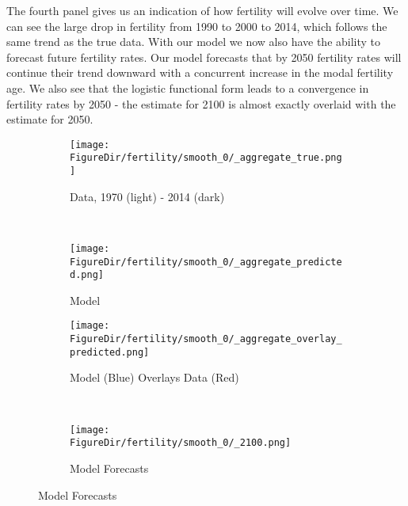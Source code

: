 \documentclass[10pt]{article}
\renewcommand{\thesection}{\arabic{section}}
\renewcommand{\thesubsection}{\thesection.\arabic{subsection}}
\renewcommand{\thesubsubsection}{\thesubsection.\arabic{subsubsection}}
\renewcommand{\subsubsection}[2][]{\oldsubsubsection[#1]{#2}\index{#1}\label{sec:\thesubsubsection}}
\numberwithin{equation}{subsection}
\newcommand*{\FigureDir}{../../graphs}
\begin{document}
\par The fourth panel gives us an indication of how fertility will evolve over time. We can see the large drop in fertility from 1990 to 2000 to 2014, which follows the same trend as the true data. With our model we now also have the ability to forecast future fertility rates. Our model forecasts that by 2050 fertility rates will continue their trend downward with a concurrent increase in the modal fertility age. We also see that the logistic functional form leads to a convergence in fertility rates by 2050 - the estimate for 2100 is almost exactly overlaid with the estimate for 2050.

\begin{figure}[!ht]
	\centering
   \caption{\label{fig:\thesubsubsection.3}Fertility Generalized Beta 2 Model Fit}
		\begin{subfigure}{0.5\textwidth}
			\centering
			\texttt{[image: \\FigureDir/fertility/smooth\_0/\_aggregate\_true.png]}
			\caption{Data, 1970 (light) - 2014 (dark)}
		\end{subfigure}%
		~ %
		\begin{subfigure}{0.5\textwidth}
			\centering
			\texttt{[image: \\FigureDir/fertility/smooth\_0/\_aggregate\_predicted.png]}
			\caption{Model}
		\end{subfigure}%
		\newline
		\begin{subfigure}{0.5\textwidth}
			\centering
			\texttt{[image: \\FigureDir/fertility/smooth\_0/\_aggregate\_overlay\_predicted.png]}
			\caption{Model (Blue) Overlays Data (Red)}
		\end{subfigure}%
		~ %
		\begin{subfigure}{0.5\textwidth}
			\centering
			\texttt{[image: \\FigureDir/fertility/smooth\_0/\_2100.png]}
			\caption{Model Forecasts}
		\end{subfigure}%
\end{figure}


\subsubsection{Mortality Rates}
\end{document}
